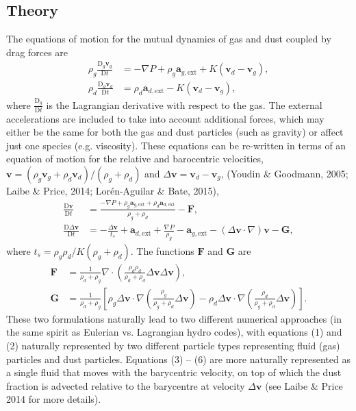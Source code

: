 \documentclass[a4paper]{article}
\renewcommand{\vec}[1]{\ensuremath{\mathbf{#1}}}
\begin{document}
\subsection{Theory}
The equations of motion for the mutual dynamics of gas and dust coupled by drag forces are 
\begin{align}
\rho_g \frac{\mathrm{D}_g \vec{v}_g}{\mathrm{D} t} &= -\nabla P  + \rho_g \vec{a}_{g, \mathrm{ext}} 
                                                     + K (\vec{v}_d - \vec{v}_g),  \\
\rho_d \frac{\mathrm{D}_d \vec{v}_d}{\mathrm{D} t} &= \rho_d \vec{a}_{d, \mathrm{ext}} 
                                                     - K (\vec{v}_d - \vec{v}_g),
\end{align}
where $\frac{\mathrm{D}_g}{\mathrm{D} t}$ is the Lagrangian derivative with respect to the gas. The external accelerations are included to take into account additional forces, which may either be the same for both the gas and dust particles (such as gravity) or affect just one species (e.g. viscosity). These equations can be re-written in terms of an equation of motion for the relative and barocentric velocities, $\vec{v} = (\rho_g \vec{v}_g + \rho_d \vec{v}_d)/(\rho_g + \rho_d)$ and $\Delta \vec{v} = \vec{v}_d - \vec{v}_g$, (Youdin \& Goodmann, 2005; Laibe \& Price, 2014; Lor\'en-Aguilar \& Bate, 2015),
\begin{align}
\frac{\mathrm{D} \vec{v}}{\mathrm{D} t} &= \frac{-\nabla P + \rho_g \vec{a}_{g, \mathrm{ext}} + \rho_d \vec{a}_{d, \mathrm{ext}}}{\rho_g + \rho_d} - \vec{F}, \\
\frac{\mathrm{D} \Delta \vec{v}}{\mathrm{D} t} &= -  \frac{\Delta \vec{v}}{t_s}+  \vec{a}_{d, \mathrm{ext}} + \frac{\nabla P}{\rho_g}  - \vec{a}_{g, \mathrm{ext}} - (\Delta \vec{v} \cdot \nabla) \vec{v} - \vec{G},
\end{align}
where $t_s = \rho_g \rho_d / K(\rho_g + \rho_d)$. The functions $\vec{F}$ and $\vec{G}$ are
\begin{align}
\vec{F} &= \frac{1}{\rho_d + \rho_g} \nabla \cdot \left(\frac{\rho_d \rho_d}{\rho_d + \rho_d} \Delta \vec{v} \Delta \vec{v} \right), \\
\vec{G} &= \frac{1}{\rho_d + \rho_g} \left[ 
 \rho_g \Delta \vec{v} \cdot \nabla \left(\frac{\rho_g}{\rho_g + \rho_d} \Delta \vec{v} \right) - 
 \rho_d \Delta \vec{v} \cdot \nabla \left(\frac{\rho_d}{\rho_g + \rho_d} \Delta \vec{v} \right) \right].
\end{align}
These two formulations naturally lead to two different numerical approaches (in the same spirit as Eulerian vs. Lagrangian hydro codes), with equations (1) and (2) naturally represented by two different particle types representing fluid (gas) particles and dust particles. Equations (3) -- (6) are more naturally represented as a single fluid that moves with the barycentric velocity, on top of which the dust fraction is advected relative to the barycentre at velocity $\Delta \vec{v}$ (see Laibe \& Price 2014 for more details). 
\end{document}
